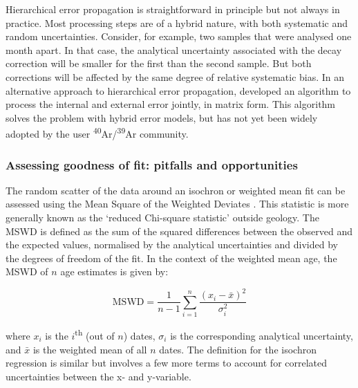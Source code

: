 \documentclass{article}
\begin{document}
Hierarchical error propagation is straightforward in principle but not
always in practice. Most processing steps are of a hybrid nature, with
both systematic and random uncertainties.  Consider, for example, two
samples that were analysed one month apart. In that case, the
analytical uncertainty associated with the decay correction will be
smaller for the first than the second sample. But both corrections
will be affected by the same degree of relative systematic bias.  In
an alternative approach to hierarchical error propagation,
\citet{vermeesch2015b} developed an algorithm to process the internal
and external error jointly, in matrix form. This algorithm solves the
problem with hybrid error models, but has not yet been widely adopted
by the user \textsuperscript{40}Ar/\textsuperscript{39}Ar community.

\subsubsection{Assessing goodness of fit: pitfalls and opportunities}
\label{sec:MSWD}

The random scatter of the data around an isochron or weighted mean fit
can be assessed using the Mean Square of the Weighted Deviates
\citep[MSWD,][]{mcintyre1966}. This statistic is more generally known
as the `reduced Chi-square statistic' outside geology. The MSWD is
defined as the sum of the squared differences between the observed and
the expected values, normalised by the analytical uncertainties and
divided by the degrees of freedom of the fit.  In the context of the
weighted mean age, the MSWD of $n$ age estimates is given by:

\begin{equation}
  \mathrm{MSWD} = \frac{1}{n-1} \sum\limits_{i=1}^{n} \frac{\left(x_i
    - \bar{x}\right)^2}{\sigma_i^2}
  \label{eq:MSWD}
\end{equation}

\noindent where $x_i$ is the $i$\textsuperscript{th} (out of $n$)
dates, $\sigma_i$ is the corresponding analytical uncertainty, and
$\bar{x}$ is the weighted mean of all $n$ dates. The definition for
the isochron regression is similar but involves a few more terms to
account for correlated uncertainties between the x- and y-variable.
\end{document}
